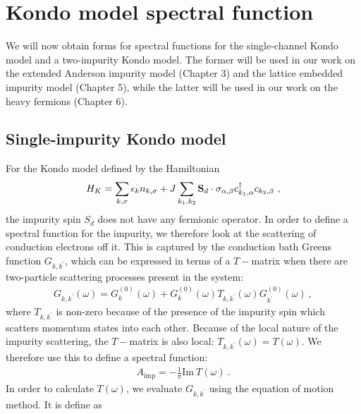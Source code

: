 \section{Kondo model spectral function}
We will now obtain forms for spectral functions for the single-channel Kondo model and a two-impurity Kondo model. The former will be used in our work on the extended Anderson impurity model (Chapter 3) and the lattice embedded impurity model (Chapter 5), while the latter will be used in our work on the heavy fermions (Chapter 6).

\subsection{Single-impurity Kondo model}
For the Kondo model defined by the Hamiltonian
\begin{equation}\begin{aligned}
	H_K = \sum_{k,\sigma}\epsilon_k n_{k,\sigma} + J\sum_{k_1,k_2} {\bf S}_d \cdot {\bf \sigma}_{\alpha,\beta} c^\dagger_{k_1,\alpha}c_{k_2,\beta}~,
\end{aligned}\end{equation}
the impurity spin \(S_d\) does not have any fermionic operator. In order to define a spectral function for the impurity, we therefore look at the scattering of conduction electrons off it. This is captured by the conduction bath Greens function \(G_{k,k^\prime}\), which can be expressed in terms of a \(T-\)matrix when there are two-particle scattering processes present in the system:
\begin{equation}\begin{aligned}\label{greensTmatrix}
	G_{k,k^\prime}(\omega) = G^{(0)}_k(\omega) + G^{(0)}_k(\omega)T_{k,k^\prime}(\omega) G^{(0)}_{k^\prime}(\omega)~,
\end{aligned}\end{equation}
where \(T_{k,k^\prime}\) is non-zero because of the presence of the impurity spin which scatters momentum states into each other. Because of the local nature of the impurity scattering, the \(T-\)matrix is also local: \(T_{k,k^\prime}(\omega) = T(\omega)\). We therefore use this to define a spectral function:
\begin{equation}\begin{aligned}
	A_\text{imp} = -\frac{1}{\pi}\text{Im}~T(\omega)~.
\end{aligned}\end{equation}
In order to calculate \(T(\omega)\), we evaluate \(G_{k,k^\prime}\) using the equation of motion method. It is define as
